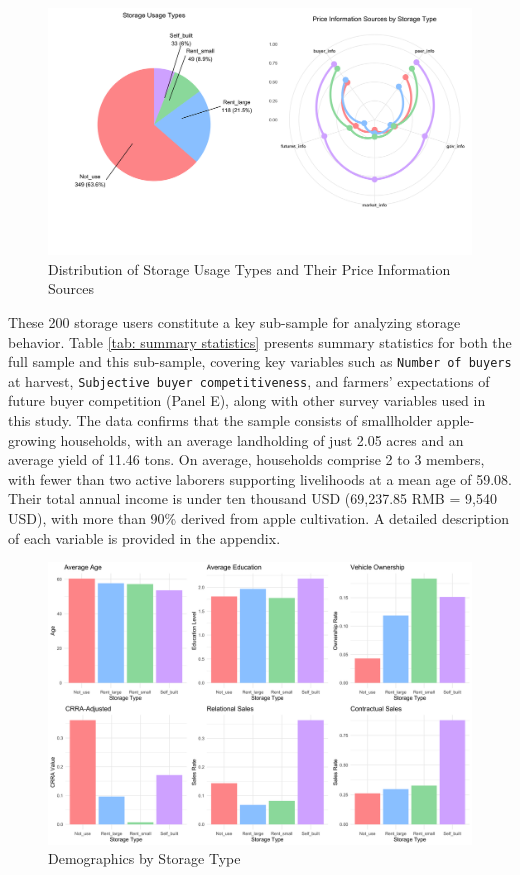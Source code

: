 \documentclass[12pt]{article}
\begin{document}
\begin{figure}[htp]
\centering
\includegraphics[width=1\textwidth]{figures/storage_usage_analysis_soft_colors.png}
\caption{Distribution of Storage Usage Types and Their Price Information Sources}
\label{Figure: pie and radar chart}
\end{figure}

These 200 storage users constitute a key sub-sample for analyzing storage behavior. Table \ref{tab: summary statistics} presents summary statistics for both the full sample and this sub-sample, covering key variables such as \texttt{Number of buyers} at harvest, \texttt{Subjective buyer competitiveness}, and farmers' expectations of future buyer competition (Panel E), along with other survey variables used in this study. The data confirms that the sample consists of smallholder apple-growing households, with an average landholding of just 2.05 acres and an average yield of 11.46 tons. On average, households comprise 2 to 3 members, with fewer than two active laborers supporting livelihoods at a mean age of 59.08. Their total annual income is under ten thousand USD (69,237.85 RMB = 9,540 USD), with more than 90\% derived from apple cultivation. A detailed description of each variable is provided in the appendix.

\begin{figure}[htp]
\centering
\includegraphics[width=1\textwidth]{figures/combined_storage_metrics.png}
\caption{Demographics by Storage Type}
\label{Figure: Demographics by Storage Type}
\end{figure}
\end{document}
